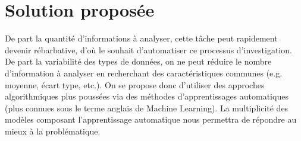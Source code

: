 \section{Solution proposée}
De part la quantité d'informations à analyser, cette tâche peut rapidement devenir rébarbative, d'où le souhait d'automatiser ce processus d'investigation. De part la variabilité des types de données, on ne peut réduire le nombre d'information à analyser en recherchant des caractéristiques communes (e.g. moyenne, écart type, etc.). On se propose donc d'utiliser des approches algorithmiques plus poussées via des méthodes d'apprentissages automatiques (plus connues sous le terme anglais de Machine Learning). La multiplicité des modèles composant l'apprentissage automatique nous permettra de répondre au mieux à la problématique.